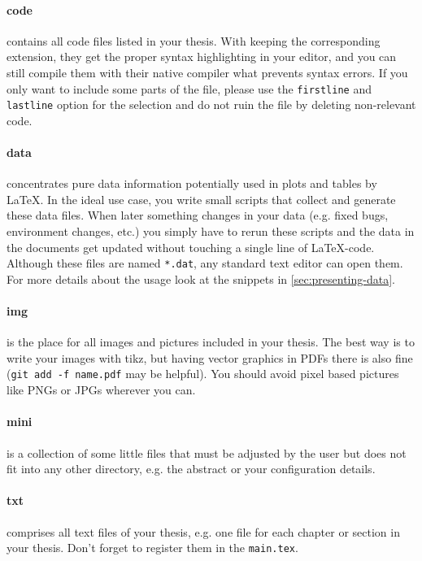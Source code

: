 \documentclass[\myrootdir/main.tex]{subfiles}
\begin{document}
\paragraph{code} contains all code files listed in your thesis.
With keeping the corresponding extension, they get the proper syntax highlighting in your editor, and you can still compile them with their native compiler what prevents syntax errors.
If you only want to include some parts of the file, please use the \texttt{firstline} and \texttt{lastline} option for the selection and do not ruin the file by deleting non-relevant code.

\paragraph{data} concentrates pure data information potentially used in plots and tables by LaTeX.
In the ideal use case, you write small scripts that collect and generate these data files.
When later something changes in your data (e.g. fixed bugs, environment changes, etc.) you simply have to rerun these scripts and the data in the documents get updated without touching a single line of LaTeX-code.
Although these files are named \texttt{*.dat}, any standard text editor can open them.
For more details about the usage look at the snippets in \cref{sec:presenting-data}.

\paragraph{img} is the place for all images and pictures included in your thesis.
The best way is to write your images with tikz, but having vector graphics in PDFs there is also fine (\texttt{git add -f name.pdf} may be helpful).
You should avoid pixel based pictures like PNGs or JPGs wherever you can.

\paragraph{mini} is a collection of some little files that must be adjusted by the user but does not fit into any other directory, e.g. the abstract or your configuration details.

\paragraph{txt} comprises all text files of your thesis, e.g. one file for each chapter or section in your thesis.
Don't forget to register them in the \texttt{main.tex}.
\end{document}
